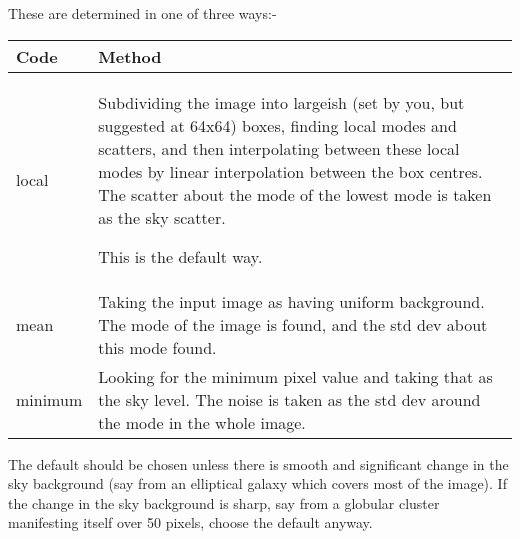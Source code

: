 \begin{small}
{{{ These are determined in one of three ways:-

\begin{tabular}{|l|p{4in}|}\hline

 Code & Method \\ \hline
 local &
  Subdividing the image into largeish (set by you, but suggested
    at 64x64) boxes, finding local modes and scatters, and then
    interpolating between these local modes by linear interpolation
    between the box centres. The scatter about the
    mode of the lowest mode is taken as the sky scatter.

        This is the default way.  \\

mean & Taking the input image as having uniform background. The mode of
        the image is found, and the std dev about this mode found. \\

minimum &
    Looking for the minimum pixel value and taking that as the sky
    level. The noise is taken as the std dev around the mode in the whole
    image. \\ \hline
\end{tabular}

 The default should be chosen unless there is smooth and
 significant change in the sky background (say from an elliptical
 galaxy which covers most of the image). If the
 change in the sky background is sharp, say from a globular cluster
 manifesting itself over 50 pixels, choose the default anyway.

}}}
\end{small}
